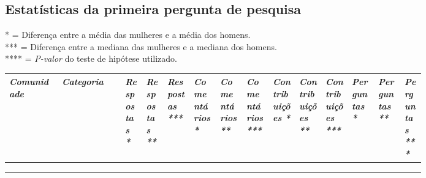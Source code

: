 
\begin{landscape}
\chapter{Estatísticas da primeira pergunta de pesquisa}
\label{app:q1}

\small
* = Diferença entre a média das mulheres e a média dos homens. \\
*** = Diferença entre a mediana das mulheres e a mediana dos homens. \\
**** = \textit{P-valor} do teste de hipótese utilizado. 

\begin{longtabu}{@{}
	p{0.1\linewidth}
	p{0.12\linewidth}
	P{0.04\linewidth}
	P{0.04\linewidth}
	P{0.05\linewidth}
	P{0.05\linewidth}
	P{0.05\linewidth}
	P{0.05\linewidth}
	P{0.05\linewidth}
	P{0.05\linewidth}
	P{0.05\linewidth}
	P{0.05\linewidth}
	P{0.05\linewidth}
	p{0.04\linewidth}@{}}
\toprule
\textit{Comunidade}  & \textit{Categoria}  
& \hspace{0pt}\textit{Respostas *} & \hspace{0pt}\textit{Respostas **} & \hspace{0pt}\textit{Respostas ***}
& \hspace{0pt}\textit{Comentários *} & \hspace{0pt}\textit{Comentários **} & \hspace{0pt}\textit{Comentários ***} 
& \hspace{0pt}\textit{Contribuições *}  & \hspace{0pt}\textit{Contribuições **} & \hspace{0pt}\textit{Contribuições ***}
& \hspace{0pt}\textit{Perguntas *} & \hspace{0pt}\textit{Perguntas **} & \hspace{0pt}\textit{Perguntas ***} \\ \midrule
\endhead

\\ \hline
\endfoot

\\
\endlastfoot


\end{longtabu}
\end{landscape}
